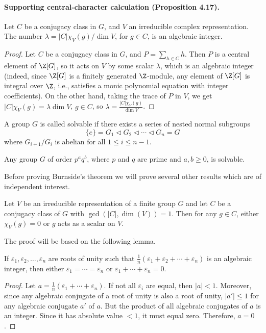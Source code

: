 
\paragraph{Supporting central-character calculation (Proposition 4.17).}
Let $C$ be a conjugacy class in $G$, and $V$ an irreducible complex representation. The number $\lambda=|C|\chi_V(g)/\dim V$, for $g\in C$, is an algebraic integer.
\begin{proof}
Let $C$ be a conjugacy class in $G$, and $P=\sum_{h\in C}h$. Then $P$ is a central element of $\Z[G]$, so it acts on $V$ by some scalar $\lambda$, which is an algebraic integer (indeed, since $\Z[G]$ is a finitely generated $\Z$-module, any element of $\Z[G]$ is integral over $\Z$, i.e., satisfies a monic polynomial equation with integer coefficients). On the other hand, taking the trace of $P$ in $V$, we get $|C|\chi_V(g)=\lambda\dim V$, $g\in C$, so $\lambda=\frac{|C|\chi_V(g)}{\dim V}$.
\end{proof}
\begin{definition}[4.18]
A group $G$ is called solvable if there exists a series of nested normal subgroups
\[
\{e\}=G_1\triangleleft G_2\triangleleft\cdots\triangleleft G_n=G
\]
where $G_{i+1}/G_i$ is abelian for all $1\leq i\leq n-1$.
\end{definition}
\begin{theorem}[4.20 (Burnside)]
Any group $G$ of order $p^aq^b$, where $p$ and $q$ are prime and $a,b\geq0$, is solvable.
\end{theorem}
Before proving Burnside's theorem we will prove several other results which are of independent interest.
\begin{theorem}[4.21]
Let $V$ be an irreducible representation of a finite group $G$ and let $C$ be a conjugacy class of $G$ with $\gcd(|C|,\dim(V))=1$. Then for any $g\in C$, either $\chi_V(g)=0$ or $g$ acts as a scalar on $V$.
\end{theorem}
The proof will be based on the following lemma.
\begin{lemma}[4.22]
If $\varepsilon_1,\varepsilon_2,\ldots,\varepsilon_n$ are roots of unity such that $\frac1n(\varepsilon_1+\varepsilon_2+\cdots+\varepsilon_n)$ is an algebraic integer, then either $\varepsilon_1=\cdots=\varepsilon_n$ or $\varepsilon_1+\cdots+\varepsilon_n=0$.
\end{lemma}
\begin{proof}
Let $a=\frac1n(\varepsilon_1+\cdots+\varepsilon_n)$. If not all $\varepsilon_i$ are equal, then $|a|<1$. Moreover, since any algebraic conjugate of a root of unity is also a root of unity, $|a'|\leq1$ for any algebraic conjugate $a'$ of $a$. But the product of all algebraic conjugates of $a$ is an integer. Since it has absolute value $<1$, it must equal zero. Therefore, $a=0$.
\end{proof}
